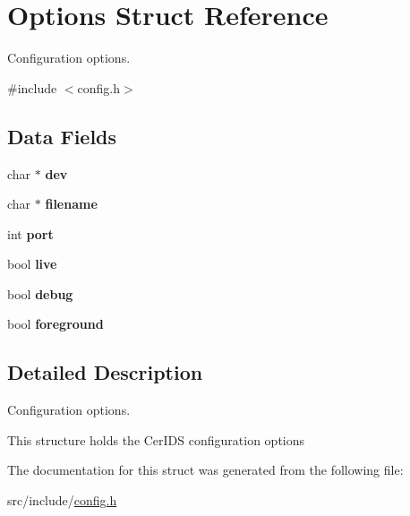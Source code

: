 \hypertarget{structOptions}{}\section{Options Struct Reference}
\label{structOptions}


Configuration options.  




{\ttfamily \#include $<$config.\+h$>$}

\subsection*{Data Fields}
\begin{DoxyCompactItemize}
\item 
\hypertarget{structOptions_a3a0af54c402856ad8f11838e7f3bb11b}{}char $\ast$ {\bfseries dev}\label{structOptions_a3a0af54c402856ad8f11838e7f3bb11b}

\item 
\hypertarget{structOptions_abec9a4fd2d6133bae143de5d15f58b8f}{}char $\ast$ {\bfseries filename}\label{structOptions_abec9a4fd2d6133bae143de5d15f58b8f}

\item 
\hypertarget{structOptions_a103e2917153e128156c87f6c0b030aac}{}int {\bfseries port}\label{structOptions_a103e2917153e128156c87f6c0b030aac}

\item 
\hypertarget{structOptions_a8358c04f269bd9938db9cfc3b148c157}{}bool {\bfseries live}\label{structOptions_a8358c04f269bd9938db9cfc3b148c157}

\item 
\hypertarget{structOptions_a2659b52db8688c4975db64de2601a13b}{}bool {\bfseries debug}\label{structOptions_a2659b52db8688c4975db64de2601a13b}

\item 
\hypertarget{structOptions_a4ff93bf5a1ff0d3d5fd3deae5a074efa}{}bool {\bfseries foreground}\label{structOptions_a4ff93bf5a1ff0d3d5fd3deae5a074efa}

\end{DoxyCompactItemize}


\subsection{Detailed Description}
Configuration options. 

This structure holds the Cer\+I\+D\+S configuration options 

The documentation for this struct was generated from the following file\+:\begin{DoxyCompactItemize}
\item 
src/include/\hyperlink{config_8h}{config.\+h}\end{DoxyCompactItemize}
